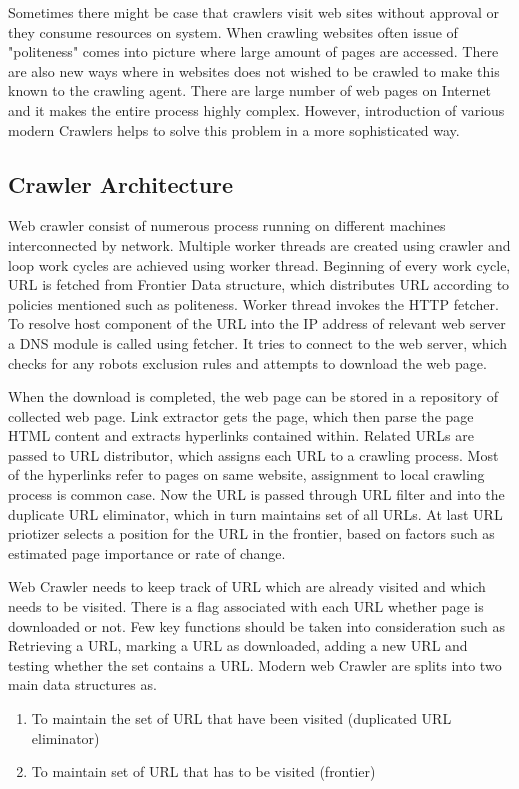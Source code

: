 \documentclass[article,type=msc,colorback,accentcolor=tud9c,twoside,11pt]{tudthesis}
\begin{document}
Sometimes there might be case that crawlers visit web sites without approval or they consume resources on system. When crawling websites often issue of "politeness" comes into picture where large amount of pages are accessed. There are also new ways where in websites does not wished to be crawled to make this known to the crawling agent. There are large number of web pages on Internet and it makes the entire process highly complex. However, introduction of various modern Crawlers helps to solve this problem in a more sophisticated way.

\subsection{Crawler Architecture}

Web crawler consist of numerous process running on different machines interconnected by network. Multiple worker threads are created using crawler and loop work cycles are achieved using worker thread. Beginning of every work cycle, URL is fetched from Frontier Data structure,  which distributes URL according to policies mentioned such as politeness. Worker thread invokes the HTTP fetcher. To resolve host component of the URL into the IP address of relevant web server a DNS module is called using fetcher. It tries to connect to the web server, which checks for any robots exclusion rules and attempts to download the web page.
	
 When the download is completed, the web page can be stored in a repository of collected web page. Link extractor gets the page, which then parse the page HTML content and extracts hyperlinks contained within. Related URLs are passed to URL distributor, which assigns each URL to a crawling process. Most of the hyperlinks refer to pages on same website, assignment to local crawling process is common case. Now the URL is passed through URL filter and into the duplicate URL eliminator, which in turn maintains set of all URLs.  At last URL priotizer selects a position for the URL in the frontier, based on factors such as estimated page importance or rate of change.
 
Web Crawler needs to keep track of URL which are already visited and which needs to be visited. There is a flag associated with each URL whether page is downloaded or not. Few key functions should be taken into consideration such as Retrieving a URL, marking a URL as downloaded, adding a new URL and testing whether the set contains a URL. Modern web Crawler are splits into two main data structures as. 
 \begin{enumerate}
\item To maintain the set of URL that have been visited (duplicated URL eliminator)
\item To maintain set of URL that has to be visited (frontier)
\end{enumerate}
\end{document}
